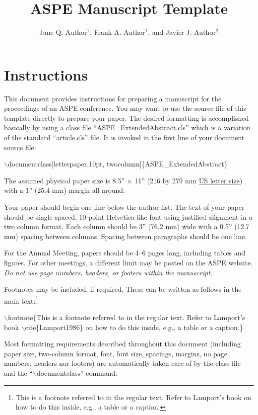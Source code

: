 \documentclass[letterpaper,10pt,twocolumn]{../aspe}
\title{ASPE Manuscript Template}
\author{Jane Q. Author$^1$, Frank A. Author$^1$, and Javier J. Author$^2$}
\begin{document}
\maketitle
\section*{Instructions}   %
This document provides instructions for preparing a manuscript for the proceedings of an {ASPE} conference. You may want to use the source file of this template directly to prepare
your paper.  The desired formatting is accomplished basically by using a class file
``ASPE\_ExtendedAbstract.cls'' which is a variation of the standard ``article.cls'' file.  It is invoked in the first line of your document source
file:
{\topsep=0pt
\begin{flushleft}
    \hspace*{3mm}$\backslash$documentclass[letterpaper,10pt,\linebreak
            \hspace*{6mm}twocolumn]\{ASPE\_ExtendedAbstract\}
\end{flushleft}
}

The assumed physical paper size is 8.5'' $\times$ 11'' (216 by 279 mm \underline{US letter size}) with a 1'' (25.4 mm) margin all around.

Your paper should begin one line below the author list.  The text of your
paper should be single spaced, 10-point Helvetica-like font using justified
alignment in a two column format. Each column should be 3'' (76.2 mm) wide
with a 0.5'' (12.7 mm) spacing between columns. Spacing between paragraphs
should be one line.

For the Annual Meeting, papers should be 4--6 pages long, including tables and figures. For other meetings, a different limit may be posted on the ASPE website.
\emph{Do not use page numbers, headers, or footers within the manuscript.}

Footnotes may be included, if required.\cite{Lamport1986} These can be
written as follows in the main text:\footnote{This is a footnote
    referred to in the regular text.  Refer to Lamport's
    book \cite{Lamport1986} on how to do this inside, e.g., a table or a
    caption.}
{\topsep=0pt
    \begin{flushleft}
        \hspace*{3mm}$\backslash$footnote\{This is a footnote referred to\linebreak
        \hspace*{6mm}in the regular text.  Refer to Lamport's\linebreak
        \hspace*{6mm}book $\backslash$cite\{Lamport1986\} on how to do\linebreak
        \hspace*{6mm}this inside, e.g., a table or a caption.\}
    \end{flushleft}
}
Most formatting requirements described throughout this document (including
paper size, two-column format, font, font size, spacings, margins, no
page numbers, headers nor footers) are automatically taken care of by the
class file and the ``$\backslash$documentclass'' command.
\end{document}
